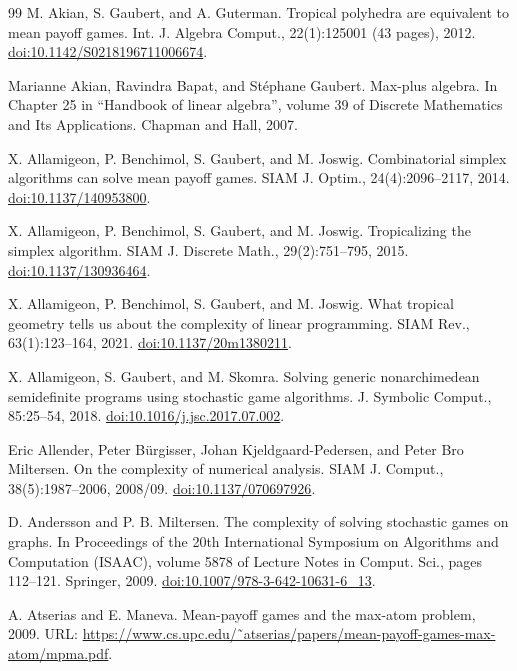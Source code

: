 \documentclass[10pt,a4paper]{article}
\theoremstyle{definition}
\begin{document}
\begin{thebibliography}{99}
 M. Akian, S. Gaubert, and A. Guterman. Tropical polyhedra are equivalent to mean payoff games. Int. J. Algebra Comput., 22(1):125001 (43 pages), 2012. \href{https://doi.org/10.1142/S0218196711006674}{doi:10.1142/S0218196711006674}.

 Marianne Akian, Ravindra Bapat, and Stéphane Gaubert. Max-plus algebra. In Chapter 25 in “Handbook of linear algebra”, volume 39 of Discrete Mathematics and Its Applications. Chapman and Hall, 2007.

 X. Allamigeon, P. Benchimol, S. Gaubert, and M. Joswig. Combinatorial simplex algorithms can solve mean payoff games. SIAM J. Optim., 24(4):2096–2117, 2014. \href{https://doi.org/10.1137/140953800}{doi:10.1137/140953800}.

 X. Allamigeon, P. Benchimol, S. Gaubert, and M. Joswig. Tropicalizing the simplex algorithm. SIAM J. Discrete Math., 29(2):751–795, 2015. \href{https://doi.org/10.1137/130936464}{doi:10.1137/130936464}.

 X. Allamigeon, P. Benchimol, S. Gaubert, and M. Joswig. What tropical geometry tells us about the complexity of linear programming. SIAM Rev., 63(1):123–164, 2021. \href{https://doi.org/10.1137/20m1380211}{doi:10.1137/20m1380211}.

 X. Allamigeon, S. Gaubert, and M. Skomra. Solving generic nonarchimedean semidefinite programs using stochastic game algorithms. J. Symbolic Comput., 85:25–54, 2018. \href{https://doi.org/10.1016/j.jsc.2017.07.002}{doi:10.1016/j.jsc.2017.07.002}.

 Eric Allender, Peter Bürgisser, Johan Kjeldgaard-Pedersen, and Peter Bro Miltersen. On the complexity of numerical analysis. SIAM J. Comput., 38(5):1987–2006, 2008/09. \href{https://doi.org/10.1137/070697926}{doi:10.1137/070697926}.

 D. Andersson and P. B. Miltersen. The complexity of solving stochastic games on graphs. In Proceedings of the 20th International Symposium on Algorithms and Computation (ISAAC), volume 5878 of Lecture Notes in Comput. Sci., pages 112–121. Springer, 2009. \href{https://doi.org/10.1007/978-3-642-10631-6_13}{doi:10.1007/978-3-642-10631-6\_13}.

 A. Atserias and E. Maneva. Mean-payoff games and the max-atom problem, 2009. URL: \href{https://www.cs.upc.edu/~atserias/papers/mean-payoff-games-max-atom/mpma.pdf}{https://www.cs.upc.edu/˜atserias/papers/mean-payoff-games-max-atom/mpma.pdf}.


\end{thebibliography}
\end{document}
